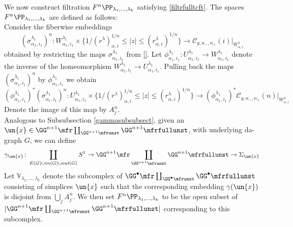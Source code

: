 \documentclass[a4paper,10pt]{amsart}
\begin{document}
%
We now construct filtration $F^n\PP_{\lambda_1,...,\lambda_k}$ satisfying \eqref{filtrfulltcft}.
The spaces $F^n \PP_{\lambda_1,...,\lambda_k}$ are defined as follows:\\
Consider the fiberwise embeddings 
\[(\sigma_{\alpha_{1},i_{1}}^{\lambda_{1}})^n \colon W_{\alpha_{1},i_{1}}^{\lambda_{1}} \times  \{1/(r^{\lambda})^{1/n}_{\alpha,i} \leq |z| \leq (r^{\lambda}_{\alpha,i})^{1/n}\}  \to {\mathcal{C}_{g,n_-,n_+}(i)}|_{W_{\alpha,i}^{\lambda}} \]
obtained by restricting the maps $\sigma_{\alpha_{1},i_{1}}^{\lambda_{1}}$ from \ref{}. Let $\phi^{\lambda_1}_{\alpha_{1},i_{1}} \colon U_{\alpha_{1},i_{1}}^{\lambda_{1}} \to W_{\alpha_{1},i_{1}}^{\lambda_{1}}$ denote the inverse of the homeomorphism $W_{\alpha_{1},i_{1}}^{\lambda_{1}} \to U_{\alpha_{1},i_{1}}^{\lambda_{1}}$. Pulling back the maps $(\sigma_{\alpha_{1},i_{1}}^{\lambda_{1}})^n$ by $\phi^{\lambda_1}_{\alpha_{1},i_{1}}$ we obtain
\[ (\phi_{\alpha_{1},i_{1}}^{\lambda_{1}})^*(\sigma_{\alpha_{1},i_{1}}^{\lambda_{1}})^n \colon U_{\alpha_{1},i_{1}}^{\lambda_{1}} \times  \{1/(r^{\lambda})^{1/n}_{\alpha,i} \leq |z| \leq (r^{\lambda}_{\alpha,i})^{1/n}\}  \to (\phi_{\alpha_{1},i_{1}}^{\lambda_{1}})^* {\mathcal{C}_{g,n_-,n_+}(n)}|_{W_{\alpha,i}^{\lambda}} \]
Denote the image of this map by $A^n_j$.\\
Analogous to Subsubsection \ref{gammasubsubsect}, given an $\un{x} \in   \GG^{n+1}\mfr \coprod_{\GG^{n+1}\mfrunst} \GG^{n+1}\mfrfullunst$, with underlying da-graph $G$, we can define
\[ \gamma_{\un{x}} \colon \coprod_{E(G) \cup in(G) \cup out(G)} S^1 \to \GG^{n+1}\mfr \coprod_{\GG^{n+1}\mfrunst} \GG^{n+1}\mfrfullunst \to \Sigma_{\un{x}}\]
Let $\mathbb{V}_{\lambda_1,...,\lambda_k}$ denote the subcomplex of $\GG^{\bullet}\mfr \coprod_{\GG^{\bullet}\mfrunst} \GG^{\bullet}\mfrfullunst$ consisting of simplices $\un{x}$ such that the corresponding embedding $\gamma(\un{x})$ is disjoint from $\bigcup_{j} A^n_j$. We then set $F^n \PP_{\lambda_1,...,\lambda_k}$ to be the open subset of $|\GG^{n+1}\mfr \coprod_{\GG^{n+1}\mfrunst} \GG^{n+1}\mfrfullunst|$ corresponding to this subcomplex.
\end{document}
